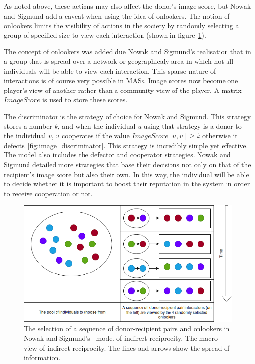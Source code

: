 \documentclass[]{final_report}
\begin{document}
As noted above, these actions may also affect the donor's image score, but Nowak and Sigmund add a caveat when using the idea of onlookers. The notion of onlookers limits the visibility of actions in the society by randomly selecting a group of specified size to view each interaction (shown in figure~\ref{fig:onlookers}).\par 
The concept of onlookers was added due Nowak and Sigmund's realisation that in a group that is spread over a network or geographicaly area in which not all individuals will be able to view each interaction. This sparse nature of interactions is of course very possible in MASs. Image scores now become one player's view of another rather than a community view of the player. A matrix $ImageScore$ is used to store these scores.\par
The discriminator is the strategy of choice for Nowak and Sigmund. This strategy stores a number $k$, and when the individual $u$ using that strategy is a donor to the individual $v$, $u$ cooperates if the value $ImageScore[u,v]\geq k$ otherwise it defects~\ref{fig:image_discriminator}. This strategy is incredibly simple yet effective. The model also includes the defector and cooperator strategies. Nowak and Sigmund detailed more strategies that base their decisions not only on that of the recipient's image score but also their own. In this way, the individual will be able to decide whether it is important to boost their reputation in the system in order to receive cooperation or not.\par
\begin{figure}
\vspace{-20pt}
\begin{framed}
	\center
	\includegraphics[width=\textwidth]{Onlookers.png}
	\caption{The selection of a sequence of donor-recipient pairs and onlookers in Nowak and Sigmund's~\cite{evol_indirect_image} model of indirect reciprocity. The macro-view of indirect reciprocity. The lines and arrows show the spread of information.}
	\label{fig:onlookers}
\end{framed}
\vspace{-20pt}
\end{figure}
\end{document}
